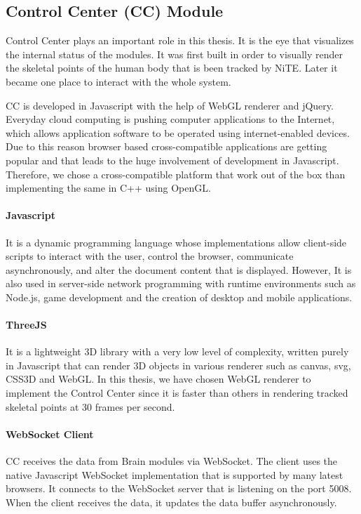 \subsection{Control Center (CC) Module} Control Center plays an important role in this thesis. It is the eye that visualizes the internal status of the modules. It was first built in order to visually render the skeletal points of the human body that is been tracked by NiTE. Later it became one place to interact with the whole system. 

CC is developed in Javascript with the help of WebGL renderer and jQuery. Everyday cloud computing is pushing computer applications to the Internet, which allows application software to be operated using internet-enabled devices. Due to this reason browser based cross-compatible applications are getting popular and that leads to the huge involvement of development in Javascript. Therefore, we chose a cross-compatible platform that work out of the box than implementing the same in C++ using OpenGL.

\paragraph*{Javascript} It is a dynamic programming language whose implementations allow client-side scripts to interact with the user, control the browser, communicate asynchronously, and alter the document content that is displayed. However, It is also used in server-side network programming with runtime environments such as Node.js, game development and the creation of desktop and mobile applications.

\paragraph*{ThreeJS} It is a lightweight 3D library with a very low level of complexity, written purely in Javascript that can render 3D objects in various renderer such as canvas, svg, CSS3D and WebGL. In this thesis, we have chosen WebGL renderer to implement the Control Center since it is faster than others in rendering tracked skeletal points at 30 frames per second.

\paragraph*{WebSocket Client} CC receives the data from Brain modules via WebSocket. The client uses the native Javascript WebSocket implementation that is supported by many latest browsers. It connects to the WebSocket server that is listening on the port 5008. When the client receives the data, it updates the data buffer asynchronously.

